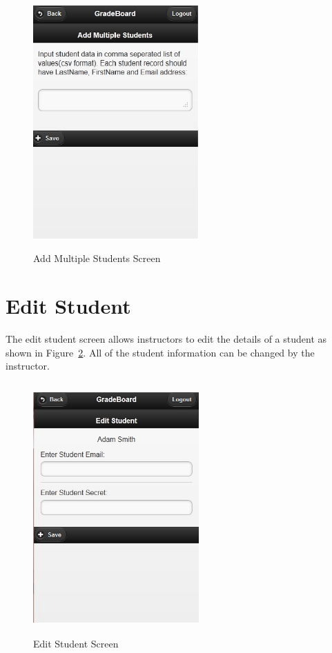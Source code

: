 \vspace{3em}
\begin{figure}[H]
\begin{center}
\includegraphics[height=3.8in,width=2.5in]{images/addstudentbulk_screen.jpg}
\caption{Add Multiple Students Screen}
\label{fig:addstudentbulk_screen}
\end{center}
\end{figure}


\newpage
\section{Edit Student}
The edit student screen allows instructors to edit the details of a student as shown in Figure~\ref{fig:editstudent_screen}. All of the student information can be changed by the instructor. 

\vspace{3em}
\begin{figure}[H]
\begin{center}
\includegraphics[height=3.8in,width=2.5in]{images/editstudent_screen.jpg}
\caption{Edit Student Screen}
\label{fig:editstudent_screen}
\end{center}
\end{figure}

